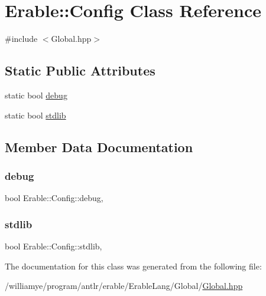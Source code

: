 \hypertarget{class_erable_1_1_config}{}\section{Erable\+::Config Class Reference}
\label{class_erable_1_1_config}


{\ttfamily \#include $<$Global.\+hpp$>$}

\subsection*{Static Public Attributes}
\begin{DoxyCompactItemize}
\item 
static bool \mbox{\hyperlink{class_erable_1_1_config_acc39c2279f6c13e8f483787227c6dbb4}{debug}}
\item 
static bool \mbox{\hyperlink{class_erable_1_1_config_aff7dbd50b543bd5339a490063194b15c}{stdlib}}
\end{DoxyCompactItemize}


\subsection{Member Data Documentation}
\mbox{\label{class_erable_1_1_config_acc39c2279f6c13e8f483787227c6dbb4}} 
\subsubsection{\texorpdfstring{debug}{debug}}
{\footnotesize\ttfamily bool Erable\+::\+Config\+::debug\hspace{0.3cm}{\ttfamily [inline]}, {\ttfamily [static]}}

\mbox{\label{class_erable_1_1_config_aff7dbd50b543bd5339a490063194b15c}} 
\subsubsection{\texorpdfstring{stdlib}{stdlib}}
{\footnotesize\ttfamily bool Erable\+::\+Config\+::stdlib\hspace{0.3cm}{\ttfamily [inline]}, {\ttfamily [static]}}



The documentation for this class was generated from the following file\+:\begin{DoxyCompactItemize}
\item 
/williamye/program/antlr/erable/\+Erable\+Lang/\+Global/\mbox{\hyperlink{_global_8hpp}{Global.\+hpp}}\end{DoxyCompactItemize}
